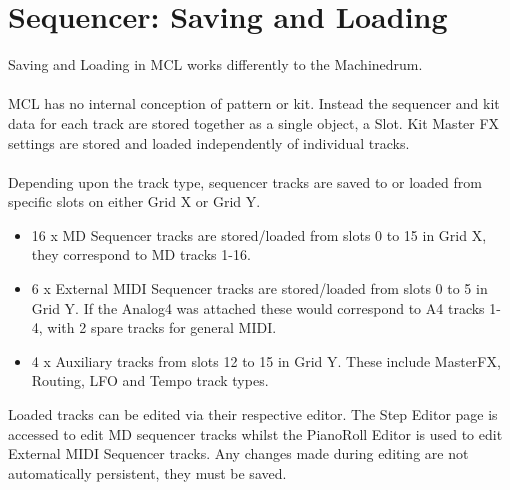 \chapter{Sequencer: Saving and Loading}
Saving and Loading in MCL works differently to the Machinedrum.\\\\
MCL has no internal conception of pattern or kit. Instead the sequencer and kit data for each track are stored together as a single object, a Slot. Kit Master FX settings are stored and loaded independently of individual tracks.
\\\\
Depending upon the track type, sequencer tracks are saved to or loaded from specific slots on either Grid X or Grid Y.

\begin{itemize}
    \item 16 x MD Sequencer tracks are stored/loaded from slots 0 to 15 in Grid X, they correspond to MD tracks 1-16.
    \item 6 x External MIDI Sequencer tracks are stored/loaded from slots 0 to 5 in Grid Y. If the Analog4 was attached these would correspond to A4 tracks 1- 4, with 2 spare tracks for general MIDI.
    \item 4 x Auxiliary tracks from slots 12 to 15 in Grid Y. These include MasterFX, Routing, LFO and Tempo track types.
\end{itemize}

Loaded tracks can be edited via their respective editor. The Step Editor page is accessed to edit MD sequencer tracks whilst the PianoRoll Editor is used to edit External MIDI Sequencer tracks. Any changes made during editing are not automatically persistent, they must be saved.\\

